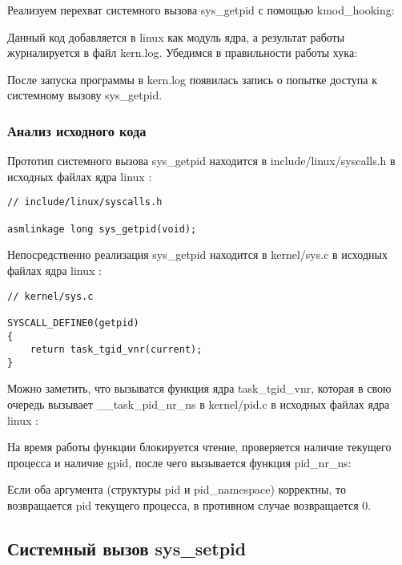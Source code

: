 \documentclass[14pt,a4paper,report]{report}
\begin{document}
Реализуем перехват системного вызова sys\_getpid с помощью kmod\_hooking:



Данный код добавляется в linux как модуль ядра, а результат работы журналируется в файл kern.log. Убедимся в правильности работы хука:



После запуска программы в kern.log появилась запись о попытке доступа к системному вызову sys\_getpid.

\subsubsection{Анализ исходного кода}

Прототип системного вызова sys\_getpid находится в include/linux/syscalls.h в исходных файлах ядра linux \cite{cite-linux-syscalls}:

\begin{lstlisting}
// include/linux/syscalls.h

asmlinkage long sys_getpid(void);
\end{lstlisting}

Непосредственно реализация sys\_getpid находится в kernel/sys.c в исходных файлах ядра linux \cite{cite-linux-sys}:

\begin{lstlisting}
// kernel/sys.c

SYSCALL_DEFINE0(getpid)
{
    return task_tgid_vnr(current);
}
\end{lstlisting}

Можно заметить, что вызыватся функция ядра task\_tgid\_vnr, которая в свою очередь вызывает \_\_task\_pid\_nr\_ns в kernel/pid.c в исходных файлах ядра linux \cite{cite-linux-pid}:



На время работы функции блокируется чтение, проверяется наличие текущего процесса и наличие gpid, после чего вызывается функция pid\_nr\_ns:



Если оба аргумента (структуры pid и pid\_namespace) корректны, то возвращается pid текущего процесса, в противном случае возвращается 0.

\subsection{Системный вызов sys\_setpid}
\end{document}
